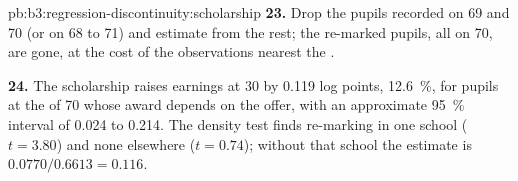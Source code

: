 \begin{solution}{pb:b3:regression-discontinuity:scholarship}
\textbf{23.} Drop the pupils recorded on 69 and 70 (or on 68 to 71) and estimate
from the rest; the re-marked pupils, all on 70, are gone, at the cost of the
observations nearest the .

\textbf{24.} The scholarship raises earnings at 30 by 0.119 log points, 12.6~\%,
for pupils at the  of 70 whose award depends on the offer, with an
approximate 95~\% interval of 0.024 to 0.214. The density test finds re-marking
in one school ($t = 3.80$) and none elsewhere ($t = 0.74$); without that school
the estimate is $0.0770/0.6613 = 0.116$.
\end{solution}
